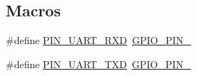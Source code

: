 \subsection*{Macros}
\begin{DoxyCompactItemize}
\item 
\#define \hyperlink{_open_mote-_c_c2538_2uart_8c_a6000ecd7fdabc2abce63287af4093774}{P\+I\+N\+\_\+\+U\+A\+R\+T\+\_\+\+R\+XD}~\hyperlink{_open_mote-_c_c2538_2source_2gpio_8h_a176efbf43a259b7bb0a85a47401505be}{G\+P\+I\+O\+\_\+\+P\+I\+N\+\_}
\item 
\#define \hyperlink{_open_mote-_c_c2538_2uart_8c_a63a0da2ae4672d786adcf2616b4ed189}{P\+I\+N\+\_\+\+U\+A\+R\+T\+\_\+\+T\+XD}~\hyperlink{_open_mote-_c_c2538_2source_2gpio_8h_a6c35af4e75c3cb57bb650feaa7a136b5}{G\+P\+I\+O\+\_\+\+P\+I\+N\+\_}
\end{DoxyCompactItemize}
